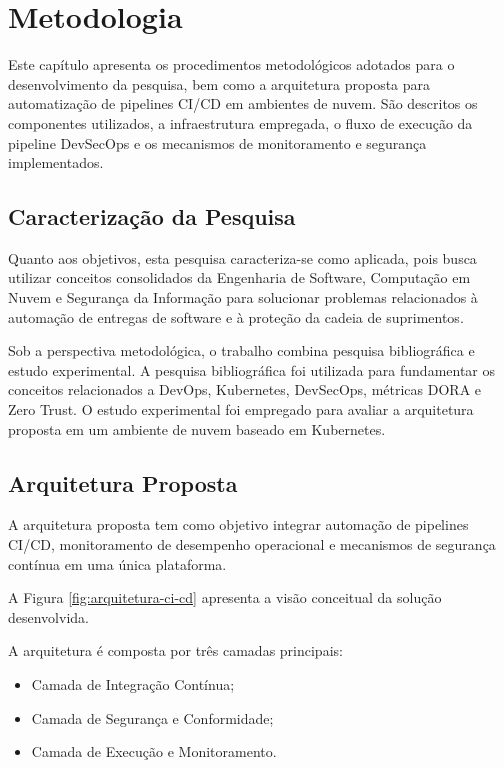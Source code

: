 \chapter{Metodologia}
\label{chap:metodologia}

Este capítulo apresenta os procedimentos metodológicos adotados para o desenvolvimento da pesquisa, bem como a arquitetura proposta para automatização de pipelines CI/CD em ambientes de nuvem. São descritos os componentes utilizados, a infraestrutura empregada, o fluxo de execução da pipeline DevSecOps e os mecanismos de monitoramento e segurança implementados.

\section{Caracterização da Pesquisa}

Quanto aos objetivos, esta pesquisa caracteriza-se como aplicada, pois busca utilizar conceitos consolidados da Engenharia de Software, Computação em Nuvem e Segurança da Informação para solucionar problemas relacionados à automação de entregas de software e à proteção da cadeia de suprimentos.

Sob a perspectiva metodológica, o trabalho combina pesquisa bibliográfica e estudo experimental. A pesquisa bibliográfica foi utilizada para fundamentar os conceitos relacionados a DevOps, Kubernetes, DevSecOps, métricas DORA e Zero Trust. O estudo experimental foi empregado para avaliar a arquitetura proposta em um ambiente de nuvem baseado em Kubernetes.

\section{Arquitetura Proposta}

A arquitetura proposta tem como objetivo integrar automação de pipelines CI/CD, monitoramento de desempenho operacional e mecanismos de segurança contínua em uma única plataforma.

A Figura \ref{fig:arquitetura-ci-cd} apresenta a visão conceitual da solução desenvolvida.



A arquitetura é composta por três camadas principais:

\begin{itemize}
    \item Camada de Integração Contínua;
    \item Camada de Segurança e Conformidade;
    \item Camada de Execução e Monitoramento.
\end{itemize}


